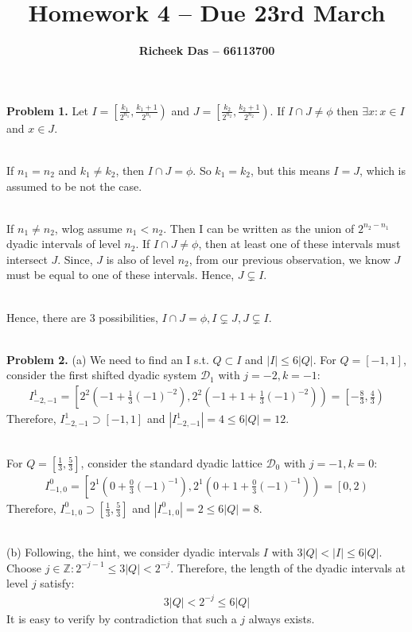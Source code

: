 \documentclass{article}
\title{Homework 4 --  Due 23rd March}
\author{\textbf{Richeek Das -- 66113700}}
\newcommand{\Z}{\mathbb{Z}}
\newcommand{\D}{\mathcal{D}}
\begin{document}
\maketitle

\textbf{Problem 1. } Let $I = \left[ \frac{k_1}{2^{n_1}}, \frac{k_1+1}{2^{n_1}} \right)$ and $J = \left[ \frac{k_2}{2^{n_2}}, \frac{k_2+1}{2^{n_2}} \right)$. If $I \cap J \neq \phi$ then $\exists x: x\in I$ and $x \in J$.
\\~

If $n_1=n_2$ and $k_1 \neq k_2$, then $I \cap J = \phi$. So $k_1 = k_2$, but this means $I = J$, which is assumed to be not the case.
\\~

If $n_1 \neq n_2$, wlog assume $n_1 < n_2$. Then I can be written as the union of $2^{n_2-n_1}$ dyadic intervals of level $n_2$. If $I \cap J \neq \phi$, then at least one of these intervals must intersect $J$. Since, $J$ is also of level $n_2$, from our previous observation, we know $J$ must be equal to one of these intervals. Hence, $J \subsetneq I$.
\\~

Hence, there are 3 possibilities, $I\cap J = \phi, I \subsetneq J, J \subsetneq I$.
\\~


\textbf{Problem 2. } (a) We need to find an I s.t. $Q \subset I$ and $|I| \leq 6 |Q|$. For $Q = [-1,1]$, consider the first shifted dyadic system $\D_1$ with $j=-2,k=-1$:
\begin{gather*}
    I_{-2,-1}^1 = \left[ 2^{2}(-1 + \frac{1}{3}(-1)^{-2}), 2^{2}(-1 + 1 + \frac{1}{3}(-1)^{-2}) \right) = \left[ -\frac{8}{3}, \frac{4}{3} \right)
\end{gather*}
Therefore, $I_{-2,-1}^1 \supset [-1, 1]$ and $|I_{-2,-1}^1| = 4 \leq 6|Q| = 12$.  
\\~

For $Q = \left[ \frac{1}{3}, \frac{5}{3}\right]$, consider the standard dyadic lattice $\D_0$ with $j=-1,k=0$:
\begin{gather*}
    I_{-1,0}^0 = \left[ 2^{1}(0 + \frac{0}{3}(-1)^{-1}), 2^{1} (0 + 1 + \frac{0}{3} (-1)^{-1}) \right) = \left[ 0, 2 \right)
\end{gather*}
Therefore, $I_{-1,0}^0 \supset [\frac{1}{3}, \frac{5}{3}]$ and $|I_{-1,0}^0| = 2 \leq 6|Q| = 8$.
\\~

(b) Following, the hint, we consider dyadic intervals $I$ with $3|Q| < |I| \leq 6|Q|$. Choose $j \in \Z: 2^{-j-1} \leq 3|Q| < 2^{-j}$. Therefore, the length of the dyadic intervals at level $j$ satisfy:
\begin{gather*}
    3|Q| < 2^{-j} \leq 6|Q|
\end{gather*}
It is easy to verify by contradiction that such a $j$ always exists.
\end{document}
